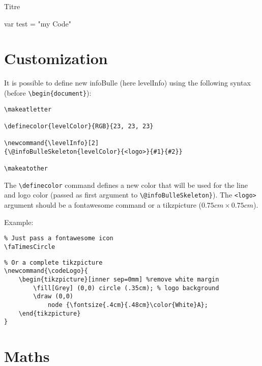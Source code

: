 \documentclass[a4paper, 11pt, oneside, fleqn]{article}
\begin{document}
\begin{CodeInfo}{Titre}
	\begin{CodeInfoLst}
var test = "my Code"
	\end{CodeInfoLst}
\end{CodeInfo}

\section{Customization}
It is possible to define new infoBulle (here levelInfo) using the following syntax (before \verb|\begin{document}|):

\begin{lstlisting}
\makeatletter

\definecolor{levelColor}{RGB}{23, 23, 23}

\newcommand{\levelInfo}[2]
{\@infoBulleSkeleton{levelColor}{<logo>}{#1}{#2}}

\makeatother
\end{lstlisting}

The \verb|\definecolor| command defines a new color that will be used for the line and logo color (passed as first argument to \verb|\@infoBulleSkeleton}|). The \verb|<logo>| argument should be a fontawesome command or a tikzpicture ($0.75cm \times 0.75cm$).

Example:
\begin{lstlisting}
% Just pass a fontawesome icon
\faTimesCircle
\end{lstlisting}

\begin{lstlisting}
% Or a complete tikzpicture
\newcommand{\codeLogo}{
	\begin{tikzpicture}[inner sep=0mm] %remove white margin
		\fill[Grey] (0,0) circle (.35cm); % logo background
		\draw (0,0)
			node {\fontsize{.4cm}{.48cm}\color{White}A};
	\end{tikzpicture}
}
\end{lstlisting}

\section{Maths}
\end{document}
